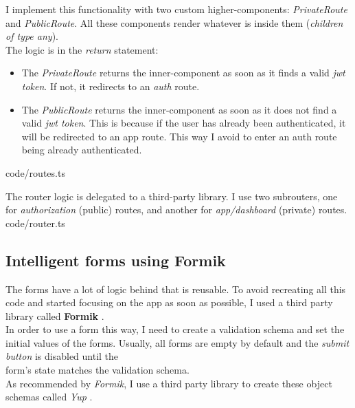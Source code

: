     I implement this functionality with two custom higher-components: \textit{PrivateRoute} and \textit{PublicRoute}. All these components render whatever is inside them (\textit{children of type any}). \\
    The logic is in the \textit{return} statement:
    \begin{itemize}[noitemsep]
        \item The \textit{PrivateRoute} returns the inner-component as soon as it finds a valid \textit{jwt token}. If not, it redirects to an \textit{auth} route.
        \item The \textit{PublicRoute} returns the inner-component as soon as it does not find a valid \textit{jwt token}. This is because if the user has already been authenticated, it will be redirected to an app route. This way I avoid to enter an auth route being already authenticated.
    \end{itemize}
    
    {code/routes.ts}

    The router logic is delegated to a third-party library. I use two subrouters, one for \textit{authorization} (public) routes, and another for \textit{app/dashboard} (private) routes. \\
    
    {code/router.ts}

    \subsection{Intelligent forms using Formik}
    The forms have a lot of logic behind that is reusable. To avoid recreating all this code and started focusing on the app as soon as possible, I used a third party library called \textbf{Formik} \cite{Formik}. \\
    In order to use a form this way, I need to create a validation schema and set the initial values of the forms. Usually, all forms are empty by default and the \textit{submit button} is disabled until the \\
    form's state matches the validation schema. \\

    As recommended by \textit{Formik}, I use a third party library to create these object schemas called \textit{Yup} \cite{Yup}.

